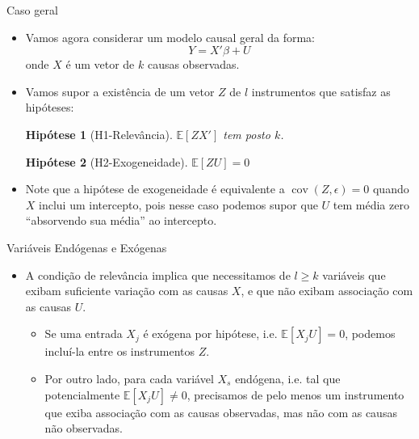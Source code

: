 \documentclass[11pt]{beamer}
\newtheorem{assumption}{Hipótese}
\begin{document}
\begin{frame}{Caso geral}
\begin{itemize}
	\item Vamos agora considerar um modelo causal geral da forma:
$$Y = X'\beta + U$$
onde $X$ é um vetor de $k$ causas observadas.
\item Vamos supor a existência de um vetor $Z$  de $l$ instrumentos que satisfaz as hipóteses:
\begin{assumption}[H1-Relevância]
	$\mathbb{E}[ZX']$ tem posto $k$.
\end{assumption}

\begin{assumption}[H2-Exogeneidade]
	$\mathbb{E}[ZU]=0$
\end{assumption}
\end{itemize}

\begin{itemize}
	\item Note que a hipótese de exogeneidade é equivalente a $\operatorname{cov}(Z,\epsilon)=0$ quando $X$ inclui um intercepto, pois nesse caso podemos supor que $U$ tem média zero ``absorvendo sua média'' ao intercepto.
\end{itemize}

\end{frame}

\begin{frame}{Variáveis Endógenas e Exógenas}
\begin{itemize}
	\item A condição de relevância implica que necessitamos de $l\geq k$ variáveis que exibam suficiente variação com as causas $X$, e que não exibam associação com as causas $U$.
	\begin{itemize}
		\item Se uma entrada $X_j$ é {\color{blue}exógena} por hipótese, i.e. $\mathbb{E}[X_j U] = 0$, podemos incluí-la entre os instrumentos $Z$.
		\item Por outro lado, para cada variável $X_s$  {\color{blue}endógena}, i.e. tal que potencialmente $\mathbb{E}[X_j U] \neq 0$, precisamos de pelo menos um instrumento que exiba associação com as causas observadas, mas não com as causas não observadas.
	\end{itemize}
\end{itemize}
\end{frame}
\end{document}
